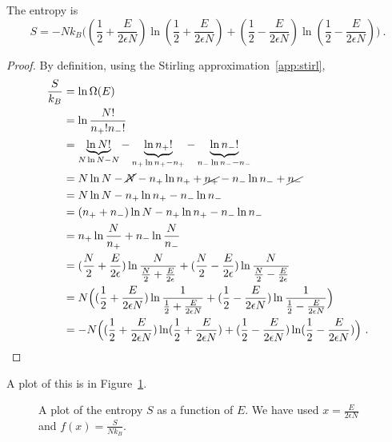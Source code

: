     The entropy is 
    \begin{equation*}
        S = - N k_B \Big ( (\frac{1}{2} + \frac{E}{2\epsilon N}) \ln (\frac{1}{2} + \frac{E}{2\epsilon N} ) + (\frac{1}{2} - \frac{E}{2\epsilon N}) \ln (\frac{1}{2} - \frac{E}{2\epsilon N} ) \Big ) ~.
    \end{equation*}
    \begin{proof}
        By definition, using the Stirling approximation~\eqref{app:stirl},
        \begin{equation*}
        \begin{aligned}
            \frac{S}{k_B} & = \ln \Omega (E) \\ & = \ln \frac{N!}{n_+! n_-!} \\ & = \underbrace{\ln N!}_{N \ln N - N} - \underbrace{\ln n_+!}_{n_+ \ln n_+ - n_+} - \underbrace{\ln n_-!}_{n_- \ln n_- - n_-} \\ & = N \ln N - \cancel{N} - n_+ \ln n_+ + \cancel{n_+} - n_- \ln n_- + \cancel{n_-} \\ & = N \ln N - n_+ \ln n_+ - n_- \ln n_- \\ & = (n_+ + n_-) \ln N - n_+ \ln n_+ - n_- \ln n_- \\ & = n_+ \ln \frac{N}{n_+} + n_- \ln \frac{N}{n_-} \\ & = (\frac{N}{2} + \frac{E}{2\epsilon}) \ln \frac{N}{\frac{N}{2} + \frac{E}{2\epsilon}} + (\frac{N}{2} - \frac{E}{2\epsilon}) \ln \frac{N}{\frac{N}{2} - \frac{E}{2\epsilon}} \\ & = N \Big ( (\frac{1}{2} + \frac{E}{2\epsilon N}) \ln \frac{1}{\frac{1}{2} + \frac{E}{2\epsilon N}} + (\frac{1}{2} - \frac{E}{2\epsilon N}) \ln \frac{1}{\frac{1}{2} - \frac{E}{2\epsilon N}} \Big ) \\ & = - N \Big ( (\frac{1}{2} + \frac{E}{2\epsilon N}) \ln (\frac{1}{2} + \frac{E}{2\epsilon N} ) + (\frac{1}{2} - \frac{E}{2\epsilon N}) \ln (\frac{1}{2} - \frac{E}{2\epsilon N} )\Big ) ~.
        \end{aligned}
        \end{equation*}
    \end{proof}
    A plot of this is in Figure~\ref{en:s}.
    \begin{figure}
        \centering
        \caption{A plot of the entropy $S$ as a function of $E$. We have used $x = \frac{E}{2 \epsilon N} $ and $f(x) = \frac{S}{N k_B}$.}
        \label{en:s}
    \end{figure}

